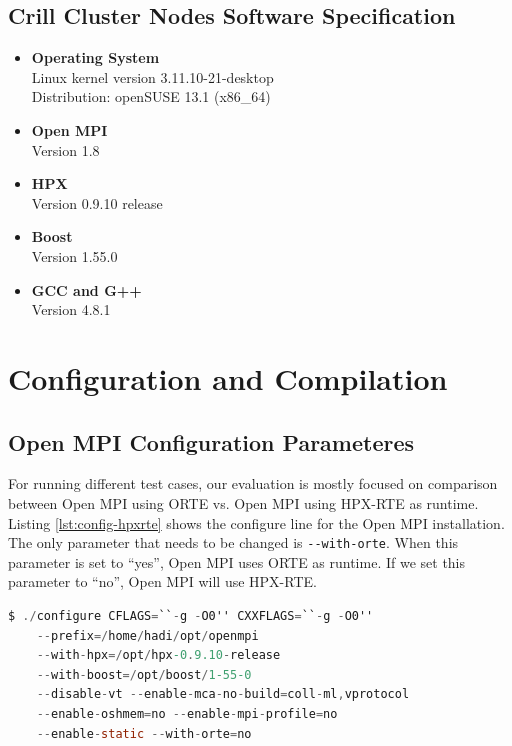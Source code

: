 \subsection{Crill Cluster Nodes Software Specification}
\begin{itemize}
\item \textbf{Operating System}\\
  Linux kernel version 3.11.10-21-desktop\\
  Distribution: openSUSE 13.1 (x86\_64)
\item \textbf{Open MPI}\\
  Version 1.8
\item \textbf{HPX}\\
  Version 0.9.10 release
\item \textbf{Boost}\\
  Version 1.55.0
\item \textbf{GCC and G++}\\
  Version 4.8.1
\end{itemize}


\section{Configuration and Compilation}

\subsection{Open MPI Configuration Parameteres}
For running different test cases, our evaluation is mostly focused on comparison between Open MPI using ORTE vs. Open MPI using HPX-RTE as runtime.
Listing \ref{lst:config-hpxrte} shows the configure line for the Open MPI installation. The only parameter that needs to be changed is \verb|--with-orte|. When this parameter is set to ``yes'', Open MPI uses ORTE as runtime. If we set this parameter to ``no'', Open MPI will use HPX-RTE.

\begin{lstlisting}[language=C, frame=single, basicstyle=\footnotesize, caption=Configure Line of Open MPI with HPX-RTE\label{lst:config-hpxrte}]
  $ ./configure CFLAGS=``-g -O0'' CXXFLAGS=``-g -O0''
    --prefix=/home/hadi/opt/openmpi
    --with-hpx=/opt/hpx-0.9.10-release
    --with-boost=/opt/boost/1-55-0
    --disable-vt --enable-mca-no-build=coll-ml,vprotocol
    --enable-oshmem=no --enable-mpi-profile=no
    --enable-static --with-orte=no
\end{lstlisting}

